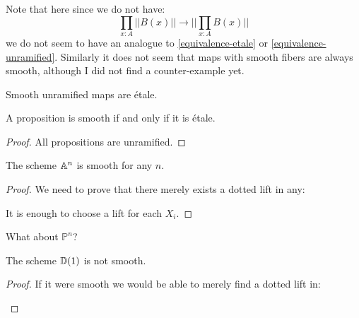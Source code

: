 Note that here since we do not have: 
\[
\prod_{x:A} ||B(x)|| \to ||\prod_{x:A}B(x)||
\]
we do not seem to have an analogue to \cref{equivalence-etale} or \cref{equivalence-unramified}. Similarly it does not seem that maps with smooth fibers are always smooth, although I did not find a counter-example yet.

\begin{proposition}
Smooth unramified maps are étale.
\end{proposition}

\begin{lemma}
A proposition is smooth if and only if it is étale. %
\end{lemma}

\begin{proof}
All propositions are unramified.
\end{proof}

\begin{lemma}
The scheme $\mathbb{A}^n$ is smooth for any $n$.
\end{lemma}

\begin{proof}
We need to prove that there merely exists a dotted lift in any:
 \begin{center}
    \end{center}
    It is enough to choose a lift for each $X_i$.
\end{proof}

What about $\mathbb{P}^n$?

\begin{lemma}
The scheme $\mathbb{D}(1)$ is not smooth.
\end{lemma}

\begin{proof}
If it were smooth we would be able to merely find a dotted lift in:
 \begin{center}
    \end{center}
\end{proof}

